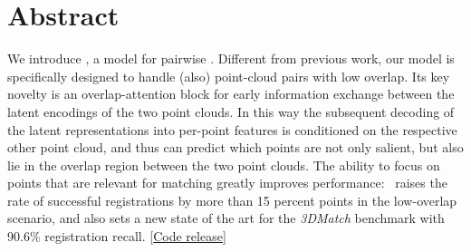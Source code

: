 \section*{Abstract}
We introduce \acro, a model for pairwise \acroexplain. Different from previous work, our model is specifically designed to handle (also) point-cloud pairs with low overlap.  Its key novelty is an  overlap-attention block for early information exchange between the latent encodings of the two point clouds. In this way the subsequent decoding of the latent representations into per-point features is conditioned on the respective other point cloud, and thus can predict which points are not only salient, but also lie in the overlap region between the two point clouds. The ability to focus on points that are relevant for matching greatly improves performance: \acro\ raises the rate of successful registrations by more than 15 percent points in the low-overlap scenario, and also sets a new state of the art for the \emph{3DMatch} benchmark with 90.6\% registration recall. [\href{https://github.com/ShengyuH/OverlapPredator}{Code release}] 